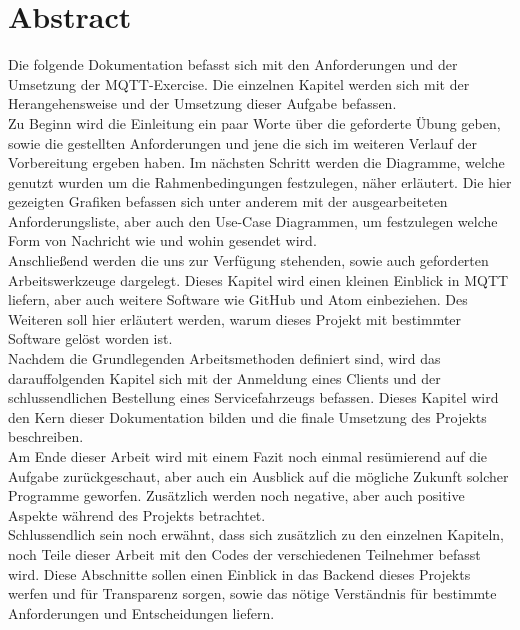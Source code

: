 \section{Abstract}
Die folgende Dokumentation befasst sich mit den Anforderungen und der Umsetzung der MQTT-Exercise. Die einzelnen Kapitel werden sich mit der Herangehensweise und der Umsetzung dieser Aufgabe befassen.\\
Zu Beginn wird die Einleitung ein paar Worte über die geforderte Übung geben, sowie die gestellten Anforderungen und jene die sich im weiteren Verlauf der Vorbereitung ergeben haben.
Im nächsten Schritt werden die Diagramme, welche genutzt wurden um die Rahmenbedingungen festzulegen, näher erläutert. Die hier gezeigten Grafiken befassen sich unter anderem mit der ausgearbeiteten Anforderungsliste, aber auch den Use-Case Diagrammen, um festzulegen welche Form von Nachricht wie und wohin gesendet wird.\\
Anschließend werden die uns zur Verfügung stehenden, sowie auch geforderten Arbeitswerkzeuge dargelegt. Dieses Kapitel wird einen kleinen Einblick in MQTT liefern, aber auch weitere Software wie GitHub und Atom einbeziehen. Des Weiteren soll hier erläutert werden, warum dieses Projekt mit bestimmter Software gelöst worden ist.\\
Nachdem die Grundlegenden Arbeitsmethoden definiert sind, wird das darauffolgenden Kapitel sich mit der Anmeldung eines Clients und der schlussendlichen Bestellung eines Servicefahrzeugs befassen. Dieses Kapitel wird den Kern dieser Dokumentation bilden und die finale Umsetzung des Projekts beschreiben.\\
Am Ende dieser Arbeit wird mit einem Fazit noch einmal resümierend auf die Aufgabe zurückgeschaut, aber auch ein Ausblick auf die mögliche Zukunft solcher Programme geworfen. Zusätzlich werden noch negative, aber auch positive Aspekte während des Projekts betrachtet.\\
Schlussendlich sein noch erwähnt, dass sich zusätzlich zu den einzelnen Kapiteln, noch Teile dieser Arbeit mit den Codes der verschiedenen Teilnehmer befasst wird. Diese Abschnitte sollen einen Einblick in das Backend dieses Projekts werfen und für Transparenz sorgen, sowie das nötige Verständnis für bestimmte Anforderungen und Entscheidungen liefern.